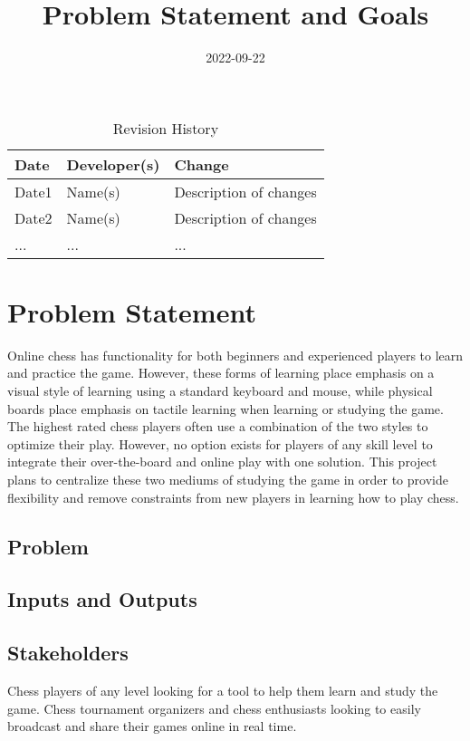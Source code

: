 \documentclass{article}
\title{Problem Statement and Goals\\\progname}
\author{\authname}
\date{2022-09-22}
\begin{document}
\maketitle

\begin{table}[hp]
\caption{Revision History} \label{TblRevisionHistory}
\begin{tabularx}{\textwidth}{llX}
\toprule
\textbf{Date} & \textbf{Developer(s)} & \textbf{Change}\\
\midrule
Date1 & Name(s) & Description of changes\\
Date2 & Name(s) & Description of changes\\
... & ... & ...\\
\bottomrule
\end{tabularx}
\end{table}

\section{Problem Statement}

{Online chess has functionality for both beginners and experienced players to learn and practice the game. However, these forms of learning place emphasis on a visual style of learning using a standard keyboard and mouse, while physical boards place emphasis on tactile learning when learning or studying the game. The highest rated chess players often use a combination of the two styles to optimize their play. However, no option exists for players of any skill level to integrate their over-the-board and online play with one solution. This project plans to centralize these two mediums of studying the game in order to provide flexibility and remove constraints from new players in learning how to play chess.}

\subsection{Problem}

\subsection{Inputs and Outputs}


\subsection{Stakeholders}
Chess players of any level looking for a tool to help them learn and study the game. Chess tournament organizers and chess enthusiasts looking to easily broadcast and share their games online in real time. 
\end{document}
